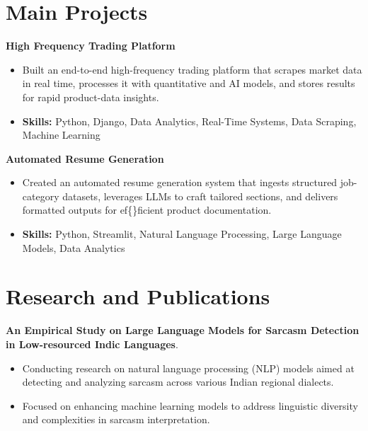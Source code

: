 \documentclass[a4paper,11pt]{article}
\begin{document}
\section{\textbf{Main Projects}}

\vspace{1mm}
  \textbf{High Frequency Trading Platform  }
\vspace{-1.5mm} %
\begin{itemize}
  \item Built an end-to-end high-frequency trading platform that scrapes market data in real time, processes it with quantitative and AI models, and stores results for rapid product-data insights.
\vspace{-3mm}
  \item \textbf{Skills:} Python, Django, Data Analytics, Real-Time Systems, Data Scraping, Machine Learning
\end{itemize}


\vspace{1mm}
   \textbf{Automated Resume Generation }
\vspace{-1.5mm} %
\begin{itemize}
  \item Created an automated resume generation system that ingests structured job-category datasets, leverages LLMs to craft tailored sections, and delivers formatted outputs for ef\{\}ficient product documentation.
\vspace{-3mm}
  \item \textbf{Skills:} Python, Streamlit, Natural Language Processing, Large Language Models, Data Analytics
\end{itemize}



\section{\textbf{Research and Publications} \hfill }
\vspace{1mm}
  \textbf{An Empirical Study on Large Language Models for Sarcasm Detection in Low-resourced Indic Languages}.
\vspace{-1mm} %
\begin{itemize}
  \item Conducting research on natural language processing (NLP) models aimed at detecting and analyzing sarcasm across various Indian regional dialects.
\vspace{-3mm}
  \item Focused on enhancing machine learning models to address linguistic diversity and complexities in sarcasm interpretation.
\end{itemize}
\end{document}
